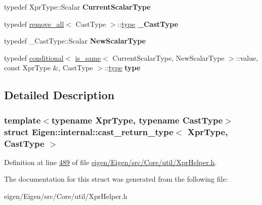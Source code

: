 \begin{DoxyCompactItemize}
typedef Xpr\+Type\+::\+Scalar {\bfseries Current\+Scalar\+Type}
\item 
\mbox{\label{struct_eigen_1_1internal_1_1cast__return__type_a1c9077977303cecc13d0069f58624662}} 
typedef \hyperlink{struct_eigen_1_1internal_1_1remove__all}{remove\+\_\+all}$<$ Cast\+Type $>$\+::\hyperlink{class_eigen_1_1internal_1_1_tensor_lazy_evaluator_writable}{type} {\bfseries \+\_\+\+Cast\+Type}
\item 
\mbox{\label{struct_eigen_1_1internal_1_1cast__return__type_aa13fd8b2e8fe3a4cdfc25b4f0961cbec}} 
typedef \+\_\+\+Cast\+Type\+::\+Scalar {\bfseries New\+Scalar\+Type}
\item 
\mbox{\label{struct_eigen_1_1internal_1_1cast__return__type_a317bf470ba15bfe4cdfc28991ef8302c}} 
typedef \hyperlink{struct_eigen_1_1internal_1_1conditional}{conditional}$<$ \hyperlink{struct_eigen_1_1internal_1_1is__same}{is\+\_\+same}$<$ Current\+Scalar\+Type, New\+Scalar\+Type $>$\+::value, const Xpr\+Type \&, Cast\+Type $>$\+::\hyperlink{class_eigen_1_1internal_1_1_tensor_lazy_evaluator_writable}{type} {\bfseries type}
\end{DoxyCompactItemize}


\subsection{Detailed Description}
\subsubsection*{template$<$typename Xpr\+Type, typename Cast\+Type$>$\newline
struct Eigen\+::internal\+::cast\+\_\+return\+\_\+type$<$ Xpr\+Type, Cast\+Type $>$}



Definition at line \hyperlink{eigen_2_eigen_2src_2_core_2util_2_xpr_helper_8h_source_l00489}{489} of file \hyperlink{eigen_2_eigen_2src_2_core_2util_2_xpr_helper_8h_source}{eigen/\+Eigen/src/\+Core/util/\+Xpr\+Helper.\+h}.



The documentation for this struct was generated from the following file\+:\begin{DoxyCompactItemize}
\item 
eigen/\+Eigen/src/\+Core/util/\+Xpr\+Helper.\+h\end{DoxyCompactItemize}
